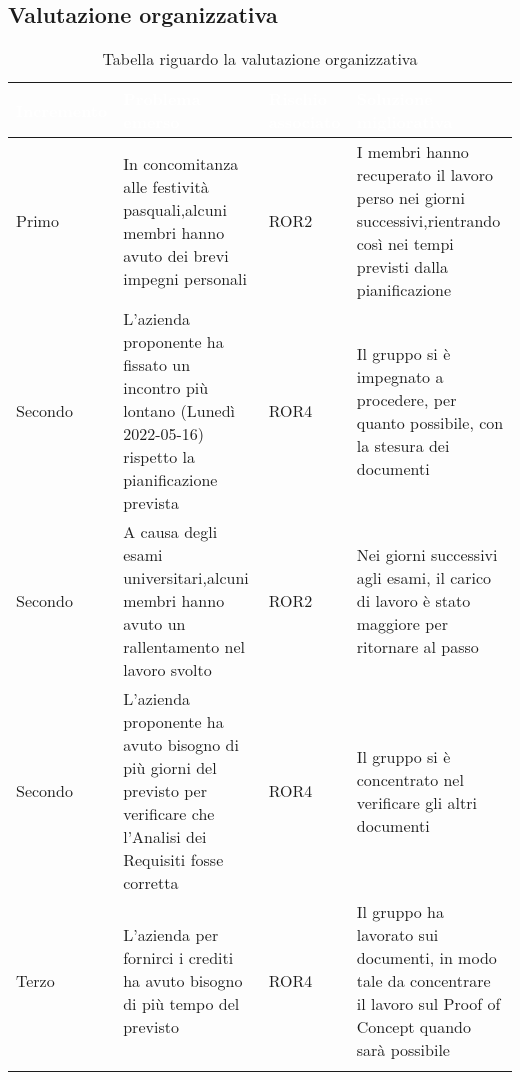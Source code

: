\subsection{Valutazione organizzativa}
{
    \setlength{\freewidth}{\dimexpr\textwidth-10\tabcolsep}
    \renewcommand{\arraystretch}{1.5}
    \centering
    \setlength{\aboverulesep}{0pt}
    \setlength{\belowrulesep}{0pt}
    \begin{longtable}{C{.25\freewidth} C{.257\freewidth} C{.16\freewidth} C{.4\freewidth}}
       \toprule
    \textcolor{white}{\textbf{Incremento}}&
    \textcolor{white}{\textbf{Problema emerso}}&
    \textcolor{white}{\textbf{Rischio associato}}&
    \textcolor{white}{\textbf{Soluzione migliorativa}}\\	
    \toprule
    \endhead
    
   Primo & In concomitanza alle festività pasquali,alcuni membri hanno avuto dei brevi impegni personali & 
          ROR2 &I membri hanno recuperato il lavoro perso nei giorni successivi,rientrando così nei tempi previsti dalla pianificazione \\
   Secondo & L'azienda proponente ha fissato un incontro più lontano (Lunedì 2022-05-16) rispetto la pianificazione prevista &
            ROR4 & Il gruppo si è impegnato a procedere, per quanto possibile, con la stesura dei documenti \\
   Secondo & A causa degli esami universitari,alcuni membri hanno avuto un rallentamento nel lavoro svolto & 
           ROR2 & Nei giorni successivi agli esami, il carico di lavoro è stato maggiore per ritornare al passo \\
   Secondo & L'azienda proponente ha avuto bisogno di più giorni del previsto per verificare che l'Analisi dei Requisiti fosse corretta & ROR4 &
            Il gruppo si è concentrato nel verificare gli altri documenti \\
   Terzo & L'azienda per fornirci i crediti ha avuto bisogno di più tempo del previsto & ROR4 & Il gruppo ha lavorato sui documenti, in modo tale da concentrare il lavoro sul Proof of Concept quando sarà possibile \\
   \bottomrule
   \caption{Tabella riguardo la valutazione organizzativa}
   \end{longtable}
}

\newpage
